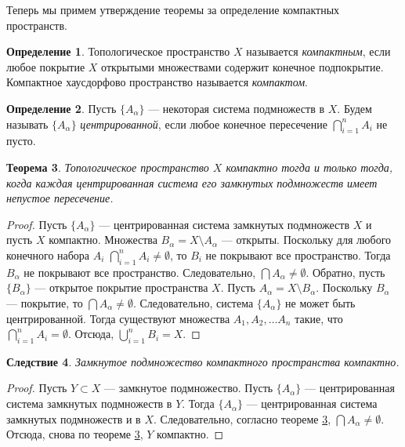 \documentclass[12pt, titlepage, oneside]{amsbook}
\newtheorem{theorem}{Теорема}[chapter]
\newtheorem{corollary}[theorem]{Следствие}
\theoremstyle{definition}
\newtheorem{definition}[theorem]{Определение}
\theoremstyle{remark}
\begin{document}
Теперь мы примем утверждение теоремы за определение компактных пространств.

\begin{definition}
Топологическое пространство $X$ называется \emph{компактным}, если любое покрытие $X$ открытыми множествами содержит конечное подпокрытие. Компактное хаусдорфово пространство называется \emph{компактом}.
\end{definition}

\begin{definition}
Пусть $\{A_{\alpha}\}$ --- некоторая система подмножеств в $X$. Будем называть $\{A_{\alpha}\}$ \emph{центрированной}, если любое конечное пересечение $\bigcap\limits_{i=1}^n A_i$ не пусто.
\end{definition}

 \begin{theorem}
\label{Kom1}
Топологическое пространство $X$ компактно тогда и только тогда, когда каждая центрированная система его замкнутых подмножеств имеет непустое пересечение.
\end{theorem}

\begin{proof}
Пусть $\{A_{\alpha}\}$ --- центрированная система замкнутых подмножеств $X$ и пусть $X$ компактно. Множества $B_{\alpha}=X\setminus A_{\alpha}$ --- открыты. Поскольку для любого конечного набора $A_i$ $\bigcap\limits_{i=1}^n A_i\neq \emptyset$, то $B_i$ не покрывают все пространство. Тогда $B_{\alpha}$ не покрывают все пространство. Следовательно, $\bigcap A_{\alpha}\neq \emptyset$. Обратно, пусть $\{B_{\alpha}\}$ --- открытое покрытие пространства $X$. Пусть $A_{\alpha}=X\setminus B_{\alpha}$. Поскольку $B_{\alpha}$ --- покрытие, то $\bigcap A_{\alpha}\neq \emptyset$. Следовательно, система $\{A_{\alpha}\}$ не может быть центрированной. Тогда существуют множества $A_1,A_2,\ldots A_n$ такие, что $\bigcap\limits_{i=1}^n A_i= \emptyset$. Отсюда, $\bigcup\limits_{i=1}^n B_i=X.$
\end{proof}

 \begin{corollary}
\label{Kom2}
Замкнутое подмножество компактного пространства компактно.
\end{corollary}

\begin{proof}
Пусть $Y\subset X$ --- замкнутое подмножество. Пусть $\{A_{\alpha}\}$ --- центрированная система замкнутых подмножеств в $Y$. Тогда $\{A_{\alpha}\}$ --- центрированная система замкнутых подмножеств и в $X$. Следовательно, согласно теореме \ref{Kom1}, $\bigcap A_{\alpha}\neq \emptyset$. Отсюда, снова по теореме \ref{Kom1}, $Y$ компактно.
\end{proof}
\end{document}
